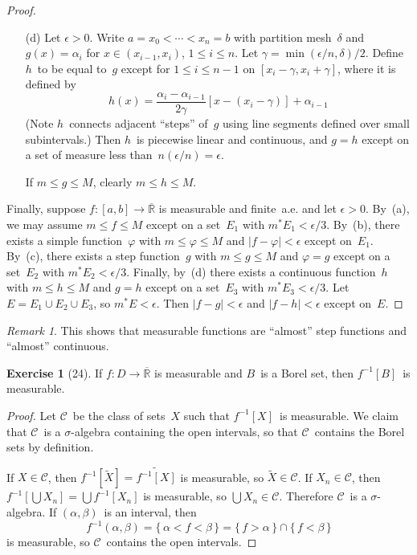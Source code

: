 \documentclass[letterpaper,12pt]{article}
\newcommand{\C}{\mathcal{C}}
\newcommand{\R}{\mathbb{R}}
\newcommand{\Rex}{\overline{\R}}
\newcommand{\union}{\cup}
\newcommand{\sect}{\cap}
\newcommand{\bigunion}{\bigcup}
\newcommand{\mo}{m^*}
\newcommand{\comp}[1]{\widetilde{#1}}
\newcommand{\abs}[1]{|{#1}|}
\newcommand{\inv}[1]{#1^{-1}}
\theoremstyle{plain}
\theoremstyle{definition}
\newtheorem*{exer}{Exercise}
\theoremstyle{remark}
\newtheorem*{rmk}{Remark}
\begin{document}
\begin{proof}
\begin{enumerate}
\item[(d)] Let \(\epsilon>0\). Write \(a=x_0<\cdots<x_n=b\) with partition mesh~\(\delta\) and \(g(x)=\alpha_i\) for \(x\in(x_{i-1},x_i)\), \(1\le i\le n\). Let \(\gamma=\min(\epsilon/n,\delta)/2\). Define \(h\)~to be equal to~\(g\) except for \(1\le i\le n-1\) on \([x_i-\gamma,x_i+\gamma]\), where it is defined by
\[h(x)=\frac{\alpha_i-\alpha_{i-1}}{2\gamma}[x-(x_i-\gamma)]+\alpha_{i-1}\]
(Note \(h\)~connects adjacent ``steps'' of~\(g\) using line segments defined over small subintervals.) Then \(h\)~is piecewise linear and continuous, and \(g=h\) except on a set of measure less than~\(n(\epsilon/n)=\epsilon\).

If \(m\le g\le M\), clearly \(m\le h\le M\).
\end{enumerate}

\noindent Finally, suppose \(f:[a,b]\to\Rex\) is measurable and finite~a.e. and let \(\epsilon>0\). By~(a), we may assume \(m\le f\le M\) except on a set~\(E_1\) with \(\mo E_1<\epsilon/3\). By~(b), there exists a simple function~\(\varphi\) with \(m\le\varphi\le M\) and \(\abs{f-\varphi}<\epsilon\) except on~\(E_1\). By~(c), there exists a step function~\(g\) with \(m\le g\le M\) and \(\varphi=g\) except on a set~\(E_2\) with \(\mo E_2<\epsilon/3\). Finally, by~(d) there exists a continuous function~\(h\) with \(m\le h\le M\) and \(g=h\) except on a set~\(E_3\) with \(\mo E_3<\epsilon/3\). Let \(E=E_1\union E_2\union E_3\), so \(\mo E<\epsilon\). Then \(\abs{f-g}<\epsilon\) and \(\abs{f-h}<\epsilon\) except on~\(E\).
\end{proof}
\begin{rmk}
This shows that measurable functions are ``almost'' step functions and ``almost'' continuous.
\end{rmk}

\begin{exer}[24]
If \(f:D\to\Rex\) is measurable and \(B\)~is a Borel set, then \(\inv{f}[B]\)~is measurable.
\end{exer}
\begin{proof}
Let \(\C\)~be the class of sets~\(X\) such that \(\inv{f}[X]\)~is measurable. We claim that \(\C\)~is a \(\sigma\)-algebra containing the open intervals, so that \(\C\)~contains the Borel sets by definition.

If \(X\in\C\), then \(\inv{f}[\comp{X}]=\comp{\inv{f}[X]}\) is measurable, so \(\comp{X}\in\C\). If \(X_n\in\C\), then \(\inv{f}[\bigunion X_n]=\bigunion\inv{f}[X_n]\) is measurable, so \(\bigunion X_n\in\C\). Therefore \(\C\)~is a \(\sigma\)-algebra. If \((\alpha,\beta)\)~is an interval, then
\[\inv{f}(\alpha,\beta)=\{\,\alpha<f<\beta\,\}=\{\,f>\alpha\,\}\sect\{\,f<\beta\,\}\]
is measurable, so \(\C\)~contains the open intervals.
\end{proof}
\end{document}
